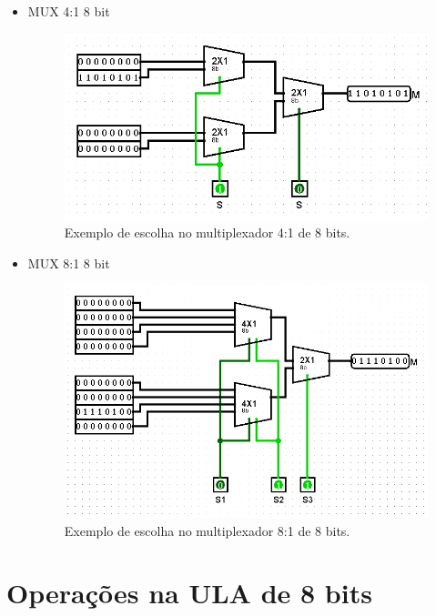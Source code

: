 \documentclass[
	12pt,				%
	openright,			%
	twoside,			%
	a4paper,			%
	english,			%
	french,				%
	spanish,			%
	brazil,				%
	]{abntex2}
\begin{document}
\begin{apendicesenv}
\begin{itemize}
\newpage
\item {MUX 4:1 8 bit}
\begin{figure}[H]
	\begin{center}
	    \includegraphics[scale=0.6]{imagens/mux418teste.png}
	\end{center}
\caption{\label{mux418teste}Exemplo de escolha no multiplexador 4:1 de 8 bits.}
\end{figure}

\item {MUX 8:1 8 bit}
\begin{figure}[H]
	\begin{center}
	    \includegraphics[scale=0.6]{imagens/mux818teste.png}
	\end{center}
\caption{\label{mux818teste}Exemplo de escolha no multiplexador 8:1 de 8 bits.}
\end{figure}

\end{itemize}

\newpage


\section{Operações na ULA de 8 bits}


\end{apendicesenv}
\end{document}
